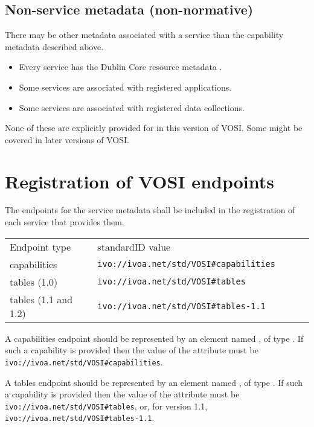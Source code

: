 \documentclass[11pt,letter]{ivoa}
\begin{document}
\subsection{Non-service metadata (non-normative)}

There may be other metadata associated with a service than the
capability metadata described above.

\begin{itemize}
\item Every service has the Dublin Core resource metadata \citep{std:DUBLINCORE}.
\item Some services are associated with registered applications.
\item Some services are associated with registered data collections. 
\end{itemize}

None of these are explicitly provided for in this version of VOSI. Some
might be covered in later versions of VOSI. 

\section{Registration of VOSI endpoints}
\label{sec:endpoints}

The endpoints for the service metadata shall be
included in the registration of each service that provides them.

\begin{tabular}{l l l l l}
\label{tab:registration}
Endpoint type & standardID value \\
capabilities & \nolinkurl{ivo://ivoa.net/std/VOSI#capabilities} \\
tables (1.0) & \nolinkurl{ivo://ivoa.net/std/VOSI#tables} \\
tables (1.1 and 1.2) & \nolinkurl{ivo://ivoa.net/std/VOSI#tables-1.1} \\
\end{tabular}

A capabilities endpoint should be represented by an element named
, of type
. If such a
capability is provided then the value of the 
attribute must be \nolinkurl{ivo://ivoa.net/std/VOSI#capabilities}.

A tables endpoint should be represented by an element named
, of type
. If such a
capability is provided then the value of the 
attribute must be \nolinkurl{ivo://ivoa.net/std/VOSI\#tables}, or, for
version 1.1, \nolinkurl{ivo://ivoa.net/std/VOSI\#tables-1.1}.
\end{document}
